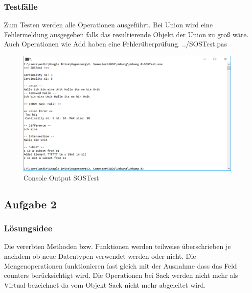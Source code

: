 \documentclass[a4papr,12pt]{article}
\begin{document}
\subsubsection*{Testfälle}
\raggedright
Zum Testen werden alle Operationen ausgeführt. Bei Union wird eine Fehlermeldung ausgegeben falls das resultierende Objekt der Union zu groß wäre. Auch Operationen wie \grqq{}Add\grqq{} haben eine Fehlerüberprüfung.
\newline
 {../SOSTest.pas}
\begin{figure}[H]
	\centering
	\includegraphics[scale=0.7]{./pictures/1.png}
	\caption{Console Output SOSTest}
	\label{fig: ParserTest}
\end{figure}
\newpage
\subsection*{Aufgabe 2}
\subsubsection*{Lösungsidee}
Die vererbten Methoden bzw. Funktionen werden teilweise überschrieben je nachdem ob neue Datentypen verwendet werden oder nicht. Die Mengenoperationen funktionieren fast gleich mit der Ausnahme dass das Feld \grqq{}counters\grqq{} berücksichtigt wird. Die Operationen bei Sack werden nicht mehr als \grqq{}Virtual\grqq{} bezeichnet da vom Objekt \grqq{}Sack\grqq{} nicht mehr abgeleitet wird.
\end{document}
